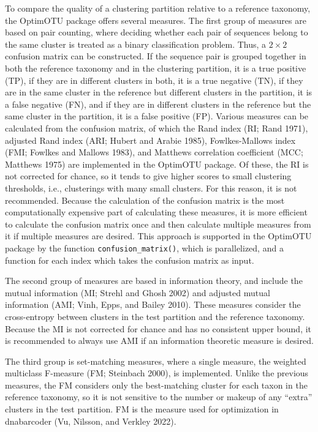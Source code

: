 \documentclass[
]{article}
\begin{document}
To compare the quality of a clustering partition relative to a reference taxonomy, the OptimOTU package offers several measures.
The first group of measures are based on pair counting, where deciding whether each pair of sequences belong to the same cluster is treated as a binary classification problem.
Thus, a \(2\times2\) confusion matrix can be constructed.
If the sequence pair is grouped together in both the reference taxonomy and in the clustering partition, it is a true positive (TP), if they are in different clusters in both, it is a true negative (TN), if they are in the same cluster in the reference but different clusters in the partition, it is a false negative (FN), and if they are in different clusters in the reference but the same cluster in the partition, it is a false positive (FP).
Various measures can be calculated from the confusion matrix, of which the Rand index (RI; Rand 1971), adjusted Rand index (ARI; Hubert and Arabie 1985), Fowlkes-Mallows index (FMI; Fowlkes and Mallows 1983), and Matthews correlation coefficient (MCC; Matthews 1975) are implemented in the OptimOTU package.
Of these, the RI is not corrected for chance, so it tends to give higher scores to small clustering thresholds, i.e., clusterings with many small clusters.
For this reason, it is not recommended.
Because the calculation of the confusion matrix is the most computationally expensive part of calculating these measures, it is more efficient to calculate the confusion matrix once and then calculate multiple measures from it if multiple measures are desired.
This approach is supported in the OptimOTU package by the function \texttt{confusion\_matrix()},
which is parallelized, and a function for each index which takes the confusion matrix as input.

The second group of measures are based in information theory, and include the mutual information (MI; Strehl and Ghosh 2002) and adjusted mutual information (AMI; Vinh, Epps, and Bailey 2010).
These measures consider the cross-entropy between clusters in the test partition and the reference taxonomy.
Because the MI is not corrected for chance and has no consistent upper bound, it is recommended to always use AMI if an information theoretic measure is desired.

The third group is set-matching measures, where a single measure, the weighted multiclass F-measure (FM; Steinbach 2000), is implemented.
Unlike the previous measures, the FM considers only the best-matching cluster for each taxon in the reference taxonomy, so it is not sensitive to the number or makeup of any ``extra'' clusters in the test partition.
FM is the measure used for optimization in dnabarcoder (Vu, Nilsson, and Verkley 2022).
\end{document}
